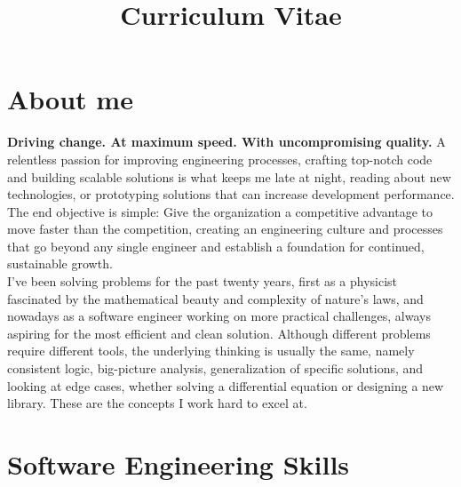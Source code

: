 \documentclass[11pt,a4paper,sans]{moderncv}        %
\title{Curriculum Vitae}                               %
\begin{document}
\makecvtitle

\section{About me}

  \textbf{Driving change. At maximum speed. With uncompromising quality.} A relentless passion for improving engineering processes, crafting top-notch code and building scalable solutions is
  what keeps me late at night, reading about new technologies, or prototyping solutions that can increase development performance. The end objective is simple: Give the organization a competitive advantage to move
  faster than the competition, creating an engineering culture and processes that go beyond any single engineer and establish a foundation for continued, sustainable growth. \\

  I've been solving problems for the past twenty years, first as a physicist fascinated by the mathematical beauty and complexity of nature's laws, and nowadays as a software
  engineer working on more practical challenges, always aspiring for the most efficient and clean solution. Although different problems require different tools, the underlying thinking
  is usually the same, namely consistent logic, big-picture analysis, generalization of specific solutions, and looking at edge cases, whether solving a
  differential equation or designing a new library. These are the concepts I work hard to excel at.

\nopagebreak[4]

\section{Software Engineering Skills}



\end{document}
